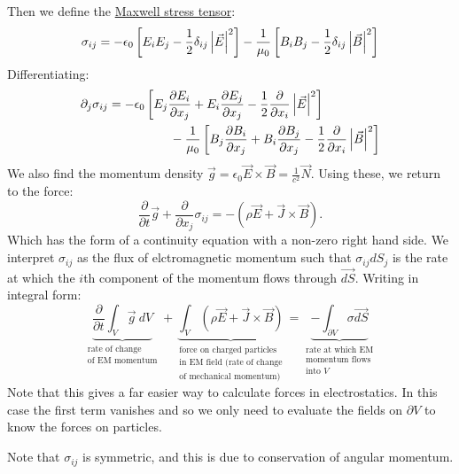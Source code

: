 \documentclass[../Main.tex]{subfiles}
\begin{document}
Then we define the \underline{Maxwell stress tensor}:
\begin{equation*}
    \sigma_{ij} = -\epsilon_0 \left[E_i E_j - \frac12 \delta_{ij} \left|\vec{E}\right|^2\right] - \frac1{\mu_0} \left[B_i B_j - \frac12 \delta_{ij} \left|\vec{B}\right|^2\right]
\end{equation*}
Differentiating:
\begin{align*}
    \partial_j \sigma_{ij} = -\epsilon_0 &\left[E_j \frac{\partial E_i}{\partial x_j} + E_i \frac{\partial E_j}{\partial x_j} - \frac12 \frac{\partial}{\partial x_i} \left|\vec{E}\right|^2\right]\\
    &\qquad - \frac1{\mu_0} \left[B_j \frac{\partial B_i}{\partial x_j} + B_i \frac{\partial B_j}{\partial x_j} - \frac12 \frac{\partial}{\partial x_i} \left|\vec{B}\right|^2\right]
\end{align*}
We also find the momentum density $\vec{g} = \epsilon_0 \vec{E} \times \vec{B} = \frac1{c^2} \vec{N}$. Using these, we return to the force:
\begin{equation}
    \frac{\partial}{\partial t} \vec{g} + \frac{\partial}{\partial x_j} \sigma_{ij} = -\left(\rho \vec{E} + \vec{J} \times \vec{B}\right).
    \label{eqnMomentumConserve}
\end{equation}
Which has the form of a continuity equation with a non-zero right hand side. We interpret $\sigma_{ij}$ as the flux of elctromagnetic momentum such that $\sigma_{ij} dS_j$ is the rate at which the $i$th component of the momentum flows through $\vec{dS}$. Writing  in integral form:
\begin{equation*}
    \underbrace{\frac{\partial}{\partial t} \int_V \vec{g}~dV}_{\substack{\text{rate of change}\\\text{of EM momentum}}} + \underbrace{\int_V \left(\rho \vec{E} + \vec{J} \times \vec{B}\right)}_{\substack{\text{force on charged particles}\\\text{in EM field (rate of change}\\\text{of mechanical momentum)}}} = \underbrace{-\int_{\partial V} \sigma \vec{dS}}_{\substack{\text{rate at which EM}\\\text{momentum flows}\\\text{into $V$}}}
\end{equation*}
Note that this gives a far easier way to calculate forces in electrostatics. In this case the first term vanishes and so we only need to evaluate the fields on $\partial V$ to know the forces on particles.

Note that $\sigma_{ij}$ is symmetric, and this is due to conservation of angular momentum.
\end{document}
